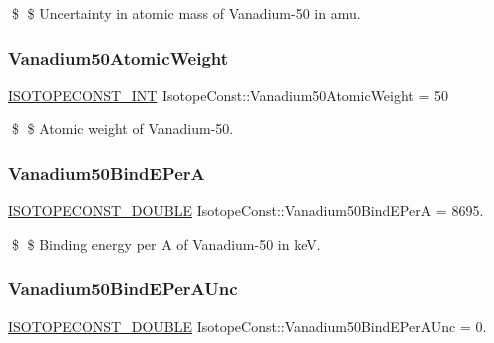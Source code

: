 \$ \$ Uncertainty in atomic mass of Vanadium-\/50 in amu. \mbox{\label{group___isotope_const-_vanadium-_v50_gaaa7192687b55a5aceb862b61998e78e5}} 
\subsubsection{\texorpdfstring{Vanadium50\+Atomic\+Weight}{Vanadium50AtomicWeight}}
{\footnotesize\ttfamily \mbox{\hyperlink{group___isotope_const-_macros_ga5f18360b3e99483a35c32d789e62621c}{I\+S\+O\+T\+O\+P\+E\+C\+O\+N\+S\+T\+\_\+\+I\+NT}} Isotope\+Const\+::\+Vanadium50\+Atomic\+Weight = 50}

\$ \$ Atomic weight of Vanadium-\/50. \mbox{\label{group___isotope_const-_vanadium-_v50_gab88bb5fa83504ab2851277840a5f767d}} 
\subsubsection{\texorpdfstring{Vanadium50\+Bind\+E\+PerA}{Vanadium50BindEPerA}}
{\footnotesize\ttfamily \mbox{\hyperlink{group___isotope_const-_macros_ga8f45a7272ce02c0b4c65c44636ed719a}{I\+S\+O\+T\+O\+P\+E\+C\+O\+N\+S\+T\+\_\+\+D\+O\+U\+B\+LE}} Isotope\+Const\+::\+Vanadium50\+Bind\+E\+PerA = 8695.}

\$ \$ Binding energy per A of Vanadium-\/50 in keV. \mbox{\label{group___isotope_const-_vanadium-_v50_ga53c07bd5708c24530d4eae6fba7fa3cd}} 
\subsubsection{\texorpdfstring{Vanadium50\+Bind\+E\+Per\+A\+Unc}{Vanadium50BindEPerAUnc}}
{\footnotesize\ttfamily \mbox{\hyperlink{group___isotope_const-_macros_ga8f45a7272ce02c0b4c65c44636ed719a}{I\+S\+O\+T\+O\+P\+E\+C\+O\+N\+S\+T\+\_\+\+D\+O\+U\+B\+LE}} Isotope\+Const\+::\+Vanadium50\+Bind\+E\+Per\+A\+Unc = 0.}

